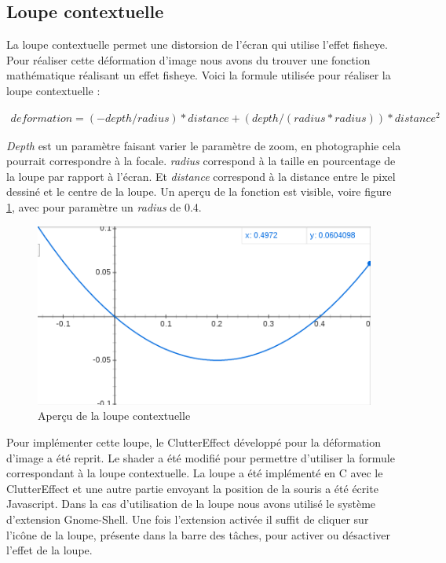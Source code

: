 \subsection{Loupe contextuelle}

La loupe contextuelle permet une distorsion de l'écran qui utilise l'effet fisheye. Pour réaliser cette déformation d'image nous avons du trouver une fonction mathématique réalisant un effet fisheye. Voici la formule utilisée pour réaliser la loupe contextuelle :

\begin{align*}
  deformation=(-depth/radius)*distance + (depth/(radius*radius))*distance^{2}&
\end{align*}

\textit{Depth} est un paramètre faisant varier le paramètre de zoom, en photographie cela pourrait correspondre à la focale. \textit{radius} correspond à la taille en pourcentage de la loupe par rapport à l'écran. Et \textit{distance} correspond à la distance entre le pixel dessiné et le centre de la loupe. Un aperçu de la fonction est visible, voire figure \ref{fig:loupeContexteFormule}, avec pour paramètre un \textit{radius} de 0.4. 

\begin{figure}[!h]
	\center	
	\includegraphics[scale=0.5]{image/loupeContexteFormule.png}
	\caption{Aperçu de la loupe contextuelle}
	\label{fig:loupeContexteFormule}
\end{figure}


Pour implémenter cette loupe, le ClutterEffect développé pour la déformation d'image a été reprit. Le shader a été modifié pour permettre d'utiliser la formule correspondant à la loupe contextuelle. La loupe a été implémenté en C avec le ClutterEffect et une autre partie envoyant la position de la souris a été écrite Javascript. Dans la cas d'utilisation de la loupe nous avons utilisé le système d'extension Gnome-Shell. Une fois l'extension activée il suffit de cliquer sur l'icône de la loupe, présente dans la barre des tâches, pour activer ou désactiver l'effet de la loupe.

